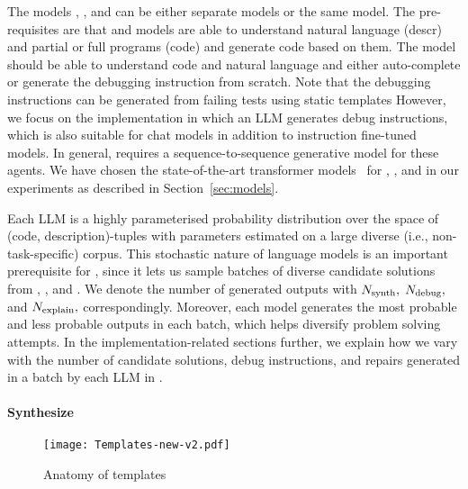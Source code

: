 The models \synthmodel{}, \debugmodel{}, and \textmodel{} can be either separate models or the same model.
The pre-requisites are that \synthmodel{} and \debugmodel{} models are able to understand natural language (descr) and partial or full programs (code) and generate code based on them. 
The model \textmodel{} should be able to understand code and natural language and either auto-complete or generate the debugging instruction from scratch. 
Note that the debugging instructions can be generated from failing tests using static templates 
However, we focus on the implementation in which an LLM generates debug instructions, which is also suitable for chat models in addition to instruction fine-tuned models. 
In general, \method{} requires a sequence-to-sequence generative model for these agents. 
We have chosen the state-of-the-art transformer models~\cite{vaswani2017:attention} for \synthmodel{}, \debugmodel{}, and \textmodel{} in our experiments as described in Section~\ref{sec:models}. 

Each LLM is a highly parameterised probability distribution over the space of (code, description)-tuples with parameters estimated on a large diverse (i.e., non-task-specific) corpus.
This stochastic nature of language models is an important prerequisite for \method{}, since it lets us sample batches of diverse candidate solutions from \synthmodel{}, \debugmodel{}, and \textmodel{}. 
We denote the number of generated outputs with $N_\text{synth}{},$ $N_\text{debug}{},$ and $N_\text{explain}{},$ correspondingly.
Moreover, each model generates the most probable and less probable outputs in each batch, which helps diversify problem solving attempts. 
In the implementation-related sections further, we explain how we vary with the number of candidate solutions, debug instructions, and repairs generated in a batch by each LLM in \method{}.


\paragraph{Synthesize}
\label{sec:synth}

\begin{figure}
    \centering
    \texttt{[image: Templates-new-v2.pdf]}
    \caption{Anatomy of \synthesize{} templates}
    \label{fig:template}
\end{figure}


